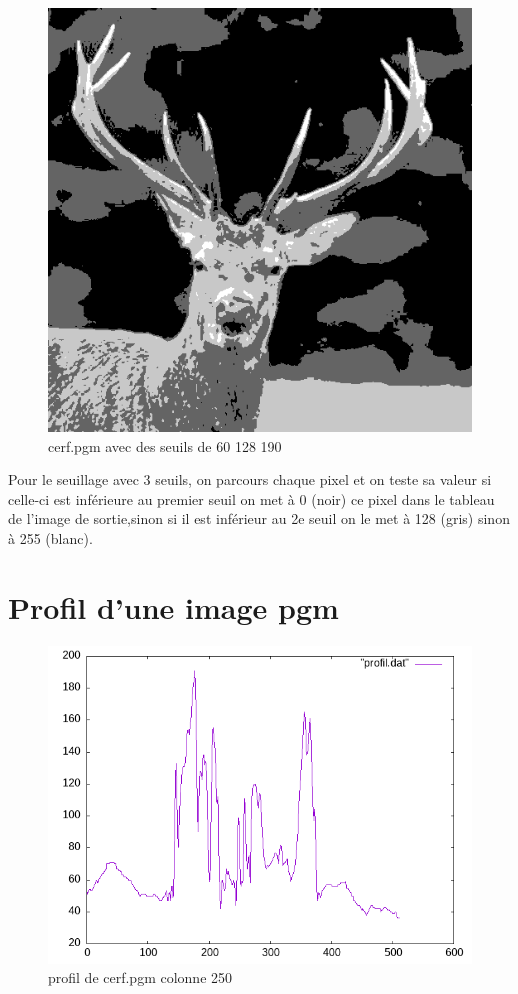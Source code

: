 \documentclass{article}
\begin{document}
\begin{figure}[h]
\centerline{\includegraphics[scale=0.3]{./rendus/cerf3Seuil.png}}
\caption{cerf.pgm avec des seuils de 60 128 190}
\end{figure}

Pour le seuillage avec 3 seuils, on parcours chaque pixel et on teste sa valeur si celle-ci est inférieure au premier seuil on met à 0 (noir) ce pixel dans le tableau de l'image de sortie,sinon si il est inférieur au 2e seuil on le met à 128 (gris) sinon à 255 (blanc).

\newpage
\section{Profil d'une image pgm}

\begin{figure}[h]
\centerline{\includegraphics[scale=0.5]{./rendus/profilpgmcerf.png}}
\caption{profil de cerf.pgm colonne 250}
\end{figure}
\end{document}
